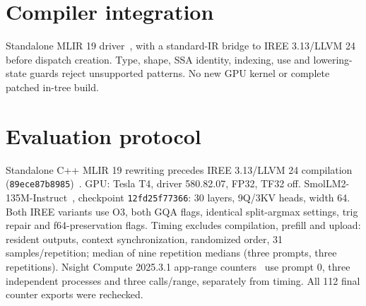 \documentclass[10pt,a4paper]{article}
\newcommand{\code}[1]{\texttt{#1}}
\newcommand{\smallnote}[1]{{\footnotesize #1\par}}
\begin{document}
\section{Compiler integration}
\begin{center}
\end{center}
\smallnote{Standalone MLIR 19 driver~\cite{mlir}, with a standard-IR bridge to IREE 3.13/LLVM 24 before dispatch creation. Type, shape, SSA identity, indexing, use and lowering-state guards reject unsupported patterns. No new GPU kernel or complete patched in-tree build.}

\newpage
\section{Evaluation protocol}
\smallnote{Standalone C++ MLIR 19 rewriting precedes IREE 3.13/LLVM 24 compilation (\code{89ece87b8985})~\cite{mlir}. GPU: Tesla T4, driver 580.82.07, FP32, TF32 off. SmolLM2-135M-Instruct~\cite{model}, checkpoint \code{12fd25f77366}: 30 layers, 9Q/3KV heads, width 64. Both IREE variants use O3, both GQA flags, identical split-argmax settings, trig repair and f64-preservation flags. Timing excludes compilation, prefill and upload: resident outputs, context synchronization, randomized order, 31 samples/repetition; median of nine repetition medians (three prompts, three repetitions). Nsight Compute 2025.3.1 app-range counters~\cite{ncu} use prompt 0, three independent processes and three calls/range, separately from timing. All 112 final counter exports were rechecked.}
\end{document}
